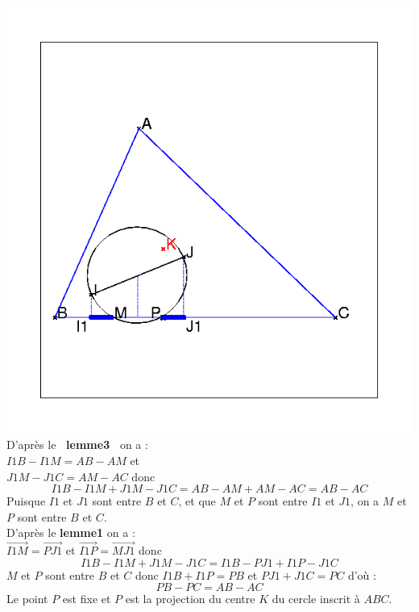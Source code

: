 \documentclass[a4paper,11pt]{book}
\begin{document}
\includegraphics[width=\textwidth]{inscritcalc}\\
D'apr\`es le {\bf\ lemme3\ } on a :\\
$I1B-I1M=AB-AM$ et\\
$J1M-J1C=AM-AC$ donc
$$I1B-I1M+J1M-J1C=AB-AM+AM-AC=AB-AC$$
Puisque $I1$ et $J1$ sont entre $B$ et $C$, et que $M$ et $P$ sont entre
$I1$ et $J1$, on a  $M$ et $P$ sont entre $B$ et $C$.\\
D'apr\`es le {\bf lemme1} on a :\\
$\overrightarrow{I1M}=\overrightarrow{PJ1}$ et 
$\overrightarrow{I1P}=\overrightarrow{MJ1}$ donc
$$I1B-I1M+J1M-J1C=I1B-PJ1+I1P-J1C$$
$M$ et $P$ sont entre $B$ et $C$ donc
$I1B+I1P=PB$ et $PJ1+J1C=PC$ d'o\`u :
$$PB-PC=AB-AC$$
Le point $P$ est fixe et $P$ est la projection du centre $K$ du cercle inscrit
\`a $ABC$.
\end{document}
